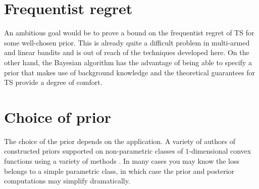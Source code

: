 \documentclass[letter, 12pt]{report}
\newcommand{\1}{\mathbf{1}}
\newcommand{\ts}{\textsc{TS}\xspace}
\theoremstyle{plain}
\theoremstyle{definition}
\theoremstyle{remark}
\begin{document}
\section{Frequentist regret}
An ambitious goal would be to prove a bound on the frequentist regret of \ts{} for some well-chosen prior.
This is already quite a difficult problem in multi-armed \citep{KKM12,AG12b} and linear bandits \citep{AG13} and is out of reach of the techniques developed here.
On the other hand, the Bayesian algorithm has the advantage of being able to specify a prior that makes use of background knowledge and the theoretical guarantees
for \ts{} provide a degree of comfort.

\section{Choice of prior} The choice of the prior depends on the application. A variety of authors of constructed priors supported on non-parametric
classes of $1$-dimensional convex functions
using a variety of methods \citep{ramgopal1993nonparametric,chang2007shape,shively2011nonparametric}.
In many cases you may know the loss belongs to a simple parametric class, in which case the prior and posterior computations may simplify dramatically.

\renewcommand{\bibname}{References}


\end{document}
